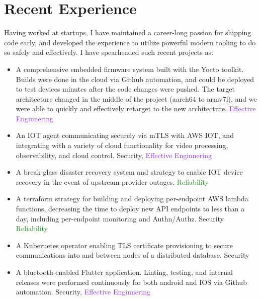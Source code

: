 \documentclass[letterpaper,11pt]{article}
\begin{document}
\section{Recent Experience}
Having worked at startups, I have maintained a
career-long passion for shipping code early, and developed the experience to
utilize powerful modern tooling to do so safely and effectively. I have
spearheaded such recent projects as:
\begin{itemize}
	\item A comprehensive embedded firmware system built with the Yocto toolkit. Builds were done in the cloud via Github automation, and could be deployed to test devices minutes after the code changes were pushed. The target architecture
	      changed in the middle of the project (aarch64 to armv7l), and we were able to quickly and effectively retarget to the new architecture. \textcolor{BlueViolet}{Effective Enginnering}
	\item An IOT agent communicating securely via mTLS with AWS IOT, and integrating with a variety of cloud functionality for video processing, observability, and cloud control. \textcolor{BrickRed}{Security}, \textcolor{BlueViolet}{Effective Enginnering}
	\item A break-glass disaster recovery system and strategy to enable IOT device recovery in the event of upstream provider outages. \textcolor{ForestGreen}{Reliability}
	\item A terraform strategy for building and deploying per-endpoint AWS lambda functions, decreasing the time to deploy new API endpoints to less than a day, including per-endpoint monitoring and Authn/Authz. \textcolor{BrickRed}{Security} \textcolor{ForestGreen}{Reliability}
	\item A Kubernetes operator enabling TLS certificate provisioning to secure communications into and between nodes of a distributed database. \textcolor{BrickRed}{Security}
	\item A bluetooth-enabled Flutter application. Linting, testing, and internal releases were performed continuously for both android and IOS via Github automation. \textcolor{BrickRed}{Security}, \textcolor{BlueViolet}{Effective Enginnering}
\end{itemize}
\end{document}
